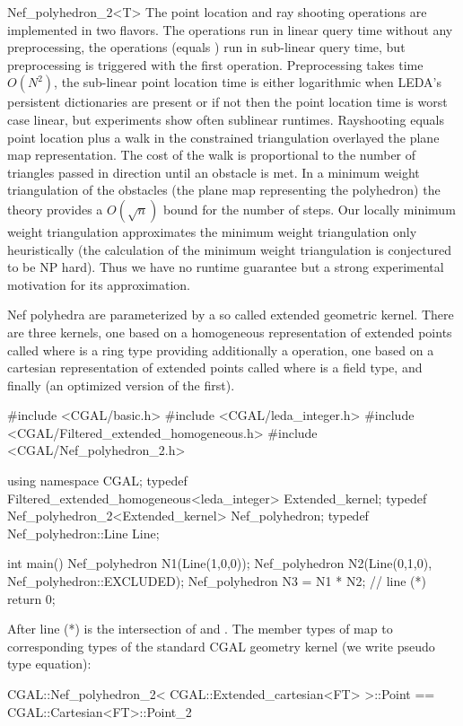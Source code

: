 \begin{ccRefClass}{Nef_polyhedron_2<T>}
The point location and ray shooting operations are implemented in two
flavors. The  operations run in linear query time without
any preprocessing, the  operations (equals )
run in sub-linear query time, but preprocessing is triggered with the
first operation. Preprocessing takes time $O(N^2)$, the sub-linear
point location time is either logarithmic when LEDA's persistent
dictionaries are present or if not then the point location time is
worst case linear, but experiments show often sublinear runtimes.
Rayshooting equals point location plus a walk in the constrained
triangulation overlayed the plane map representation. The cost of the
walk is proportional to the number of triangles passed in direction
 until an obstacle is met. In a minimum weight triangulation of
the obstacles (the plane map representing the polyhedron) the theory
provides a $O(\sqrt{n})$ bound for the number of steps. Our locally
minimum weight triangulation approximates the minimum weight
triangulation only heuristically (the calculation of the minimum
weight triangulation is conjectured to be NP hard). Thus we have no
runtime guarantee but a strong experimental motivation for its
approximation.

\ccExample

Nef polyhedra are parameterized by a so called extended geometric
kernel. There are three kernels, one based on a homogeneous
representation of extended points called
 where  is a ring type providing
additionally a  operation, one based on a cartesian
representation of extended points called 
where  is a field type, and finally
 (an optimized version of the
first).
\begin{ccExampleCode}
#include <CGAL/basic.h>
#include <CGAL/leda_integer.h>
#include <CGAL/Filtered_extended_homogeneous.h>
#include <CGAL/Nef_polyhedron_2.h>

using namespace CGAL;
typedef  Filtered_extended_homogeneous<leda_integer> Extended_kernel;
typedef  Nef_polyhedron_2<Extended_kernel>  Nef_polyhedron;
typedef  Nef_polyhedron::Line               Line;

int main()
{
  Nef_polyhedron N1(Line(1,0,0));
  Nef_polyhedron N2(Line(0,1,0), Nef_polyhedron::EXCLUDED);
  Nef_polyhedron N3 = N1 * N2; // line (*)
  return 0;
}
\end{ccExampleCode}
After line (*)  is the intersection of  and . 
The member types of 
map to corresponding types of the standard CGAL geometry kernel
(we write pseudo type equation):
\begin{ccExampleCode}
CGAL::Nef_polyhedron_2< CGAL::Extended_cartesian<FT> >::Point
  == CGAL::Cartesian<FT>::Point_2


\end{ccExampleCode}
\end{ccRefClass}
